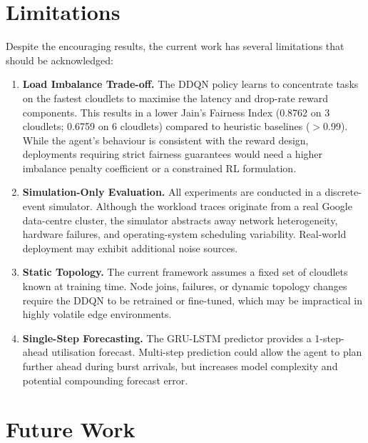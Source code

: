 \section{Limitations}
\label{sec:limitations}

Despite the encouraging results, the current work has several
limitations that should be acknowledged:

\begin{enumerate}

  \item \textbf{Load Imbalance Trade-off.}
  The DDQN policy learns to concentrate tasks on the
  fastest cloudlets to maximise the latency and drop-rate
  reward components. This results in a lower Jain's Fairness
  Index (0.8762 on 3 cloudlets; 0.6759 on 6 cloudlets)
  compared to heuristic baselines ($>$0.99). While the
  agent's behaviour is consistent with the reward design,
  deployments requiring strict fairness guarantees would
  need a higher imbalance penalty coefficient or a
  constrained RL formulation.

  \item \textbf{Simulation-Only Evaluation.}
  All experiments are conducted in a discrete-event
  simulator. Although the workload traces originate from
  a real Google data-centre cluster, the simulator
  abstracts away network heterogeneity, hardware failures,
  and operating-system scheduling variability. Real-world
  deployment may exhibit additional noise sources.

  \item \textbf{Static Topology.}
  The current framework assumes a fixed set of cloudlets
  known at training time. Node joins, failures, or
  dynamic topology changes require the DDQN to be
  retrained or fine-tuned, which may be impractical in
  highly volatile edge environments.

  \item \textbf{Single-Step Forecasting.}
  The GRU-LSTM predictor provides a 1-step-ahead
  utilisation forecast. Multi-step prediction could
  allow the agent to plan further ahead during burst
  arrivals, but increases model complexity and
  potential compounding forecast error.

\end{enumerate}

\section{Future Work}
\label{sec:future}

